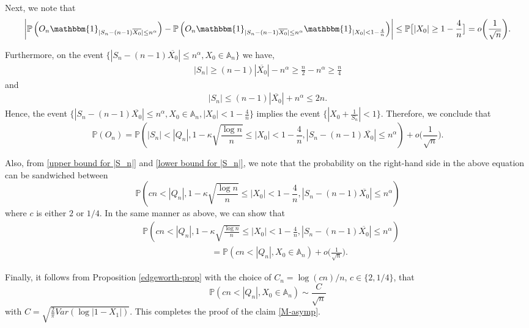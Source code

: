 \documentclass[9pt,a4paper,reqno]{amsart}
\theoremstyle{mine}
\theoremstyle{definition}
\theoremstyle{remark}
\newcommand{\mb}{\mathbb}
\begin{document}
Next, we note that 
\[ \biggl|\mb{P}\left(O_n \mathbbm{1}_{|S_n- (n-1) \overline{X_0}| \leq n^\alpha}\right) - \mb{P}\left(O_n \mathbbm{1}_{|S_n- (n-1) \overline{X_0}| \leq n^\alpha}\mathbbm{1}_{|X_0| <  1 -\frac{4}{n}}\right) \biggr| \leq \mb{P}\bigl[ |X_0| \geq 1 - \frac{4}{n}\bigr] = o\biggl(\frac{1}{\sqrt{n}}\biggr). \]

Furthermore, on the event $\{|S_n- (n-1) \overline{X_0}| \leq n^\alpha, X_0 \in \mb{A}_n\}$ we have,
\begin{align}\label{lower bound for |S_n|}
    |S_n| \geq (n-1)|\overline{X_0}|- n^\alpha \geq \frac{n}{2}-n^\alpha \geq \frac{n}{4}
\end{align}
and 
\begin{align}\label{upper bound for |S_n|}
    |S_n| \leq (n-1)|\overline{X_0}| +n^\alpha \leq 2n.
\end{align}
Hence, the event $\{|S_n- (n-1) \overline{X_0}| \leq n^\alpha, X_0 \in \mb{A}_n, |X_0| < 1 - \frac{4}{n}\}$ implies the event $\{|X_0 + \frac{1}{S_n}| <1\}$. 
Therefore, we conclude that 
\[ \mb{P}(O_n) = \mathbb{P}\left(|S_n|< |Q_n|, 1- \kappa\sqrt{\frac{\log n}{n}} \leq |X_0| < 1 - \frac{4}{n} , {|S_n- (n-1) \overline{X_0}| \leq n^\alpha}\right) + o\biggl(\frac{1}{\sqrt{n}}\biggr). \]

Also, from \eqref{upper bound for |S_n|} and \eqref{lower bound for |S_n|}, we note that the probability on the right-hand side in the above equation can be sandwiched between 
\[ \mathbb{P}\left( cn< |Q_n|, 1- \kappa\sqrt{\frac{\log n}{n}} \leq |X_0| < 1 - \frac{4}{n} , {|S_n- (n-1) \overline{X_0}| \leq n^\alpha}\right)\]
where $c$ is either $2$ or $1/4$. In the same manner as above, we can show that
\begin{align}
    &\mathbb{P}\left( cn< |Q_n|, 1- \kappa\sqrt{\frac{\log n}{n}} \leq |X_0| < 1 - \frac{4}{n} , {|S_n- (n-1) \overline{X_0}| \leq n^\alpha}\right) \\
    & \qquad\qquad \qquad\qquad= \mb{P}(cn < |Q_n|, X_0 \in \mb{A}_n) + o\biggl(\frac{1}{\sqrt{n}}\biggr).\nonumber
\end{align}

Finally, it follows from Proposition \ref{edgeworth-prop} with the choice of $C_n = \log(cn)/n$, $c\in\{ 2, 1/4\}$, that 
\[ \mb{P}(cn < |Q_n|, X_0 \in \mb{A}_n)\sim \frac{C}{\sqrt{n}}\]
with $C = \sqrt{\frac{2}{\pi} Var(\log|1-X_1|)}$. This completes the proof of the claim \eqref{M-asymp}. 
\end{document}
